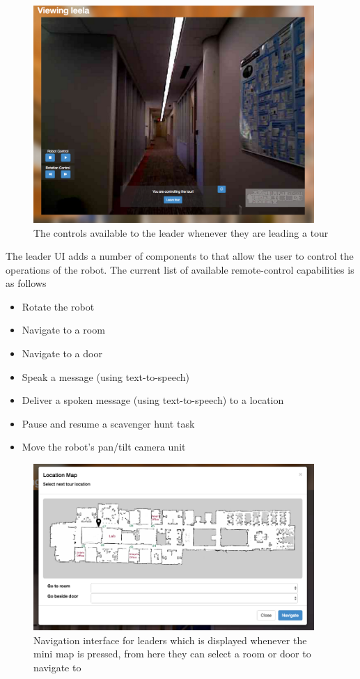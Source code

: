 \documentclass[
  oneside,
  11pt, a4paper,
  footinclude=true,
  headinclude=true,
  cleardoublepage=empty
]{article}
\begin{document}
\begin{figure}
  \centering
  \includegraphics[width=0.95\textwidth]{leader_ui}
  \caption{The controls available to the leader whenever they are leading a
  tour}
  \label{fig:leader_controls}
\end{figure}

The leader UI adds a number of components to that allow the user to control the
operations of the robot. The current list of available remote-control
capabilities is as follows

\begin{itemize}
  \item Rotate the robot
  \item Navigate to a room 
  \item Navigate to a door 
  \item Speak a message (using text-to-speech)
  \item Deliver a spoken message (using text-to-speech) to a location
  \item Pause and resume a scavenger hunt task
  \item Move the robot's pan/tilt camera unit
\end{itemize}

\begin{figure}
  \centering
  \includegraphics[width=0.95\textwidth]{nav_ui}
  \caption{Navigation interface for leaders which is displayed whenever the
  mini map is pressed, from here they can select a room or door to navigate to}
  \label{fig:nav_interface}
\end{figure}
\end{document}
